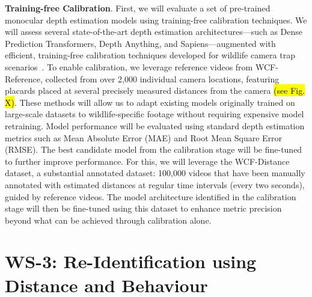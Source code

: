 \textbf{Training-free Calibration}. First, we will evaluate a set of pre-trained monocular depth estimation models using training-free calibration techniques. We will assess several state-of-the-art depth estimation architectures—such as Dense Prediction Transformers, Depth Anything, and Sapiens—augmented with efficient, training-free calibration techniques developed for wildlife camera trap scenarios~\cite{}. To enable calibration, we leverage reference videos from WCF-Reference, collected from over 2,000 individual camera locations, featuring placards placed at several precisely measured distances from the camera \hl{(see Fig. X)}. These methods will allow us to adapt existing models originally trained on large-scale datasets to wildlife-specific footage without requiring expensive model retraining. Model performance will be evaluated using standard depth estimation metrics such as Mean Absolute Error (MAE) and Root Mean Square Error (RMSE). The best candidate model from the calibration stage will be fine-tuned to further improve performance. For this, we will leverage the WCF-Distance dataset, a substantial annotated dataset: 100,000 videos that have been manually annotated with estimated distances at regular time intervals (every two seconds), guided by reference videos. The model architecture identified in the calibration stage will then be fine-tuned using this dataset to enhance metric precision beyond what can be achieved through calibration alone.

\section*{WS-3: Re-Identification using Distance and Behaviour}



